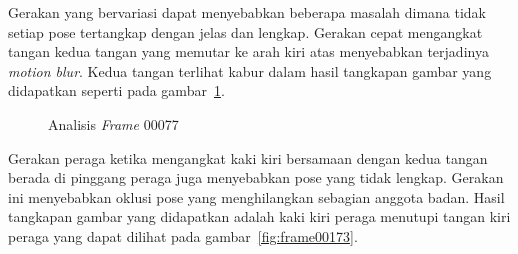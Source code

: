 Gerakan yang bervariasi dapat menyebabkan beberapa masalah dimana tidak setiap pose
tertangkap dengan jelas dan lengkap. Gerakan cepat mengangkat tangan kedua tangan yang memutar
ke arah kiri atas menyebabkan terjadinya \textit{motion blur}. Kedua tangan terlihat kabur
dalam hasil tangkapan gambar yang didapatkan seperti pada gambar~\ref{fig:frame00077}.


\begin{figure}[htbp]
    \begin{center}
    \end{center}
    \vspace{-20pt}
    \captionsetup{labelfont=bf, textfont=bf}
    \caption{Analisis \textit{Frame} 00077}
    \vspace{-10pt}
    \captionsetup{labelfont=md, textfont=md}
    \label{fig:frame00077}
\end{figure}

Gerakan peraga ketika mengangkat kaki kiri bersamaan dengan kedua tangan berada di pinggang
peraga juga menyebabkan pose yang tidak lengkap. Gerakan ini menyebabkan oklusi pose yang
menghilangkan sebagian anggota badan. Hasil tangkapan gambar yang didapatkan
adalah kaki kiri peraga menutupi tangan kiri peraga yang dapat dilihat pada gambar~\ref{fig:frame00173}.

